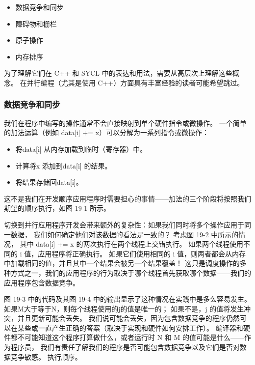 \begin{itemize}
	\item 数据竞争和同步

	\item 障碍物和栅栏

	\item 原子操作

	\item 内存排序
\end{itemize}

为了理解它们在 C++ 和 SYCL 中的表达和用法，需要从高层次上理解这些概念。 
在并行编程（尤其是使用 C++）方面具有丰富经验的读者可能希望跳过。

\subsubsection{数据竞争和同步}
我们在程序中编写的操作通常不会直接映射到单个硬件指令或微操作。 
一个简单的加法运算（例如 data[i] += x）可以分解为一系列指令或微操作：

\begin{itemize}
	\item 将data[i] 从内存加载到临时（寄存器）中。

	\item 计算将x 添加到data[i] 的结果。

	\item 将结果存储回data[i]。
\end{itemize}

这不是我们在开发顺序应用程序时需要担心的事情——加法的三个阶段将按照我们期望的顺序执行，如图 19-1 所示。

切换到并行应用程序开发会带来额外的复杂性：如果我们同时将多个操作应用于同一数据，
我们如何确定他们对该数据的看法是一致的？ 考虑图 19-2 中所示的情况，
其中 data[i] += x 的两次执行在两个线程上交错执行。 如果两个线程使用不同的 i 值，应用程序将正确执行。 
如果它们使用相同的 i 值，则两者都会从内存中加载相同的值，并且其中一个结果会被另一个结果覆盖！
 这只是调度操作的多种方式之一，我们的应用程序的行为取决于哪个线程首先获取哪个数据——我们的应用程序包含数据竞争。

图 19-3 中的代码及其图 19-4 中的输出显示了这种情况在实践中是多么容易发生。 
如果M大于等于N，则每个线程使用的j的值是唯一的； 如果不是，j 的值将发生冲突，并且更新可能会丢失。 
我们说可能会丢失，因为包含数据竞争的程序仍然可以在某些或一直产生正确的答案（取决于实现和硬件如何安排工作）。 
编译器和硬件都不可能知道这个程序打算做什么，或者运行时 N 和 M 的值可能是什么——作为程序员，
我们有责任了解我们的程序是否可能包含数据竞争以及它们是否对数据竞争敏感。 执行顺序。

